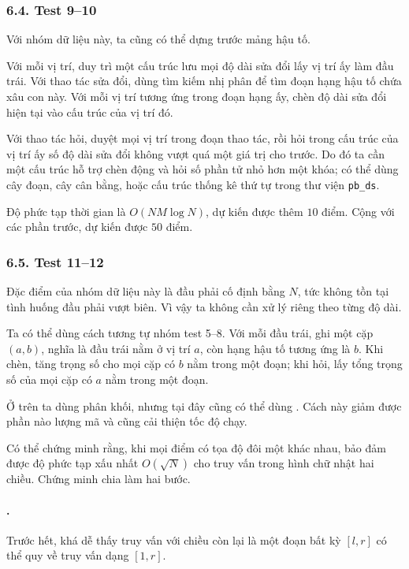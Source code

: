 \documentclass[11pt]{article}
\begin{document}
\subsubsection*{6.4. Test 9--10}

Với nhóm dữ liệu này, ta cũng có thể dựng trước mảng hậu tố.

Với mỗi vị trí, duy trì một cấu trúc lưu mọi độ dài sửa đổi lấy vị trí ấy làm
đầu trái. Với thao tác sửa đổi, dùng tìm kiếm nhị phân để tìm đoạn hạng hậu tố
chứa xâu con này. Với mỗi vị trí tương ứng trong đoạn hạng ấy, chèn độ dài sửa
đổi hiện tại vào cấu trúc của vị trí đó.

Với thao tác hỏi, duyệt mọi vị trí trong đoạn thao tác, rồi hỏi trong cấu trúc
của vị trí ấy số độ dài sửa đổi không vượt quá một giá trị cho trước. Do đó ta
cần một cấu trúc hỗ trợ chèn động và hỏi số phần tử nhỏ hơn một khóa; có thể
dùng cây đoạn, cây cân bằng, hoặc cấu trúc thống kê thứ tự trong thư viện
\texttt{pb\_ds}.

Độ phức tạp thời gian là \(O(NM\log N)\), dự kiến được thêm \(10\) điểm. Cộng
với các phần trước, dự kiến được \(50\) điểm.

\subsubsection*{6.5. Test 11--12}

Đặc điểm của nhóm dữ liệu này là đầu phải cố định bằng \(N\), tức không tồn
tại tình huống đầu phải vượt biên. Vì vậy ta không cần xử lý riêng theo từng
độ dài.

Ta có thể dùng cách tương tự nhóm test 5--8. Với mỗi đầu trái, ghi một cặp
\((a,b)\), nghĩa là đầu trái nằm ở vị trí \(a\), còn hạng hậu tố tương ứng là
\(b\). Khi chèn, tăng trọng số cho mọi cặp có \(b\) nằm trong một đoạn; khi
hỏi, lấy tổng trọng số của mọi cặp có \(a\) nằm trong một đoạn.

Ở trên ta dùng phân khối, nhưng tại đây cũng có thể dùng . Cách
này giảm được phần nào lượng mã và cũng cải thiện tốc độ chạy.

Có thể chứng minh rằng, khi mọi điểm có tọa độ đôi một khác nhau, 
bảo đảm được độ phức tạp xấu nhất \(O(\sqrt N)\) cho truy vấn trong hình chữ
nhật hai chiều. Chứng minh chia làm hai bước.

\paragraph{.}
Trước hết, khá dễ thấy truy vấn với chiều còn lại là một đoạn bất kỳ \([l,r]\)
có thể quy về truy vấn dạng \([1,r]\).
\end{document}
